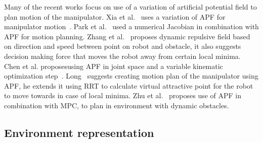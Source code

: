\documentclass[letterpaper, 10 pt, conference]{ieeeconf}  %
\begin{document}
Many of the recent works focus on use of a variation of artificial potential field to plan motion of the manipulator. Xia et al.~\cite{c49} uses a variation of APF for manipulator motion~\cite{c49}. Park et al.~\cite{park2020trajectory} used a numerical Jacobian in combination with APF for motion planning. Zhang et al.~\cite{zhang2021obstacle} proposes dynamic repulsive field based on direction and speed between point on robot and obstacle, it also suggests decision making force that moves the robot away from certain local minima. Chen et al. proposesusing APF in joint space and a variable kinematic optimization step~\cite{c50}. Long~\cite{c44} suggests creating motion plan of the manipulator using APF, he extends it using RRT to calculate virtual attractive point for the robot to move towards in case of local minima. Zhu et al.~\cite{c48} proposes use of APF in combination with MPC, to plan in environment with dynamic obstacles.


\subsection{Environment representation}

\end{document}
